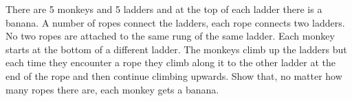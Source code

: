 There are 5 monkeys and 5 ladders and at the top of each ladder there is a banana. A number of ropes connect the ladders, each rope connects two ladders. No two ropes are attached to the same rung of the same ladder. Each monkey starts at the bottom of a different ladder. The monkeys climb up the ladders but each time they encounter a rope they climb along it to the other ladder at the end of the rope and then continue climbing upwards. Show that, no matter how many ropes there are, each monkey gets a banana.